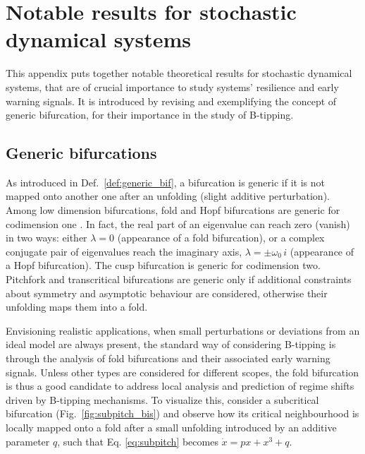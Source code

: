 
\chapter{Notable results for stochastic dynamical systems}
\label{appresults}


This appendix puts together notable theoretical results for stochastic dynamical systems, that are of crucial importance to study systems' resilience and early warning signals. It is introduced by revising and exemplifying the concept of generic bifurcation, for their importance in the study of B-tipping. \\




\tocless\section{Generic bifurcations}
\label{sec:generic_bif}
As introduced in Def.~\ref{def:generic_bif}, a bifurcation is generic if it is not mapped onto another one after an unfolding (slight additive perturbation). Among low dimension bifurcations, fold and Hopf bifurcations are generic for codimension one \citep{kuznetsov2013elements}. In fact, the real part of an eigenvalue can reach zero (vanish) in two ways: either $\lambda = 0$ (appearance of a fold bifurcation), or a complex conjugate pair of eigenvalues reach the imaginary axis, $\lambda = \pm \omega_0 \, i$ (appearance of a Hopf bifurcation). The cusp bifurcation is generic for codimension two. Pitchfork and transcritical bifurcations are generic only if additional constraints about symmetry and asymptotic behaviour are considered, otherwise their unfolding maps them into a fold.

Envisioning realistic applications, when small perturbations or deviations from an ideal model are always present, the standard way of considering B-tipping is through the analysis of fold bifurcations and their associated early warning signals. Unless other types are considered for different scopes, the fold bifurcation is thus a good candidate to address local analysis and prediction of regime shifts driven by B-tipping mechanisms. To visualize this, consider a subcritical bifurcation (Fig.~\ref{fig:subpitch_bis}) and observe how its critical neighbourhood is locally mapped onto a fold after a small unfolding introduced by an additive parameter $q$, such that Eq. \ref{eq:subpitch} becomes $\dot{x} = px +x^3 +q$. 


